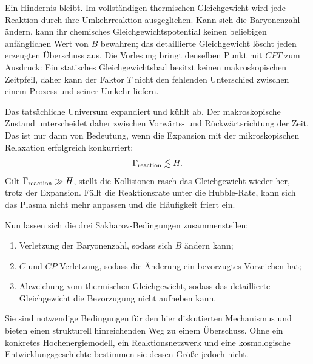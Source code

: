 Ein Hindernis bleibt. Im vollständigen thermischen Gleichgewicht wird jede Reaktion durch ihre Umkehrreaktion ausgeglichen. Kann sich die Baryonenzahl ändern, kann ihr chemisches Gleichgewichtspotential keinen beliebigen anfänglichen Wert von \(B\) bewahren; das detaillierte Gleichgewicht löscht jeden erzeugten Überschuss aus. Die Vorlesung bringt denselben Punkt mit \(CPT\) zum Ausdruck: Ein statisches Gleichgewichtsbad besitzt keinen makroskopischen Zeitpfeil, daher kann der Faktor \(T\) nicht den fehlenden Unterschied zwischen einem Prozess und seiner Umkehr liefern.

Das tatsächliche Universum expandiert und kühlt ab. Der makroskopische Zustand unterscheidet daher zwischen Vorwärts- und Rückwärtsrichtung der Zeit. Das ist nur dann von Bedeutung, wenn die Expansion mit der mikroskopischen Relaxation erfolgreich konkurriert:
\begin{equation}
\Gamma_{\rm reaction}\lesssim H.
\label{eq:c08-freezeout-condition}
\end{equation}
Gilt \(\Gamma_{\rm reaction}\gg H\), stellt die Kollisionen rasch das Gleichgewicht wieder her, trotz der Expansion. Fällt die Reaktionsrate unter die Hubble-Rate, kann sich das Plasma nicht mehr anpassen und die Häufigkeit friert ein.

\begin{classroomqa}\end{classroomqa}

Nun lassen sich die drei Sakharov-Bedingungen zusammenstellen:
\begin{enumerate}
\item Verletzung der Baryonenzahl, sodass sich \(B\) ändern kann;
\item \(C\) und \(CP\)-Verletzung, sodass die Änderung ein bevorzugtes Vorzeichen hat;
\item Abweichung vom thermischen Gleichgewicht, sodass das detaillierte Gleichgewicht die Bevorzugung nicht aufheben kann.
\end{enumerate}
Sie sind notwendige Bedingungen für den hier diskutierten Mechanismus und bieten einen strukturell hinreichenden Weg zu einem Überschuss. Ohne ein konkretes Hochenergiemodell, ein Reaktionsnetzwerk und eine kosmologische Entwicklungsgeschichte bestimmen sie dessen Größe jedoch nicht.

